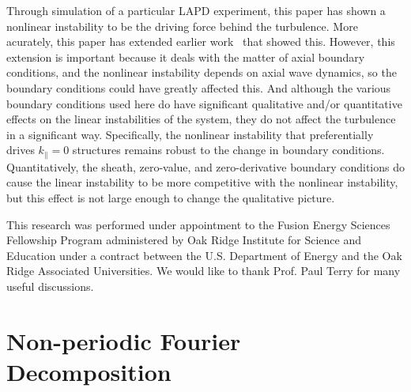 \documentclass[showpacs,preprintnumbers,amsmath,amssymb,superscriptaddress,aip]{revtex4-1}
\def\para{\parallel}
\begin{document}
Through simulation of a particular LAPD experiment, this paper has shown a nonlinear instability to be the driving force behind the turbulence. More acurately, this paper has extended
earlier work~\cite{friedman2012b} that showed this. However, this extension is important because it deals with the matter of axial boundary conditions, and the nonlinear instability
depends on axial wave dynamics, so the boundary conditions could have greatly affected this. And although the various boundary conditions used here do
have significant qualitative and/or quantitative effects on the linear instabilities of the system, they do not affect the turbulence in a significant way.
Specifically, the nonlinear instability that preferentially drives $k_\para = 0$ structures remains robust to the change in boundary conditions. Quantitatively, the sheath, zero-value,
and zero-derivative boundary conditions
do cause the linear instability to be more competitive with the nonlinear instability, but this effect is not large enough to change the qualitative picture. 




\begin{acknowledgments}
This research was performed under appointment to the Fusion Energy Sciences Fellowship Program administered by Oak Ridge Institute for
Science and Education under a contract between the U.S. Department of Energy and the Oak Ridge Associated Universities. We would like to thank Prof. Paul Terry for many useful discussions.
\end{acknowledgments}


\appendix


\section{Non-periodic Fourier Decomposition}
\end{document}
